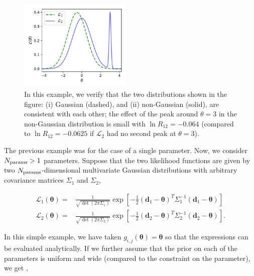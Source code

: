 \documentclass[amsmath, amssymb, reprint, aps]{revtex4-1}
\newcommand{\donev}{\textbf{d}_1}
\newcommand{\dtwov}{\textbf{d}_2}
\newcommand{\tv}{\bm{\theta}}
\begin{document}
{    \begin{figure}
        \centering
        \includegraphics[width=0.48\textwidth]{nongaus2.pdf}
        \caption{In this example, we verify that the two distributions shown in the figure: (i) Gaussian (dashed), and (ii) non-Gaussian (solid), are consistent with each other; the effect of the peak around $\theta=3$ in the non-Gaussian distribution is small with $\ln R_{12}=-0.064$ (compared to $\ln R_{12}=-0.0625$ if $\mathcal{L}_2$ had no second peak at $\theta=3$).}
        \label{fig:example1}
    \end{figure}
        
    The previous example was for the case of a single parameter. Now, we consider $N_{\rm params}>1$ parameters. Suppose that the two likelihood functions are given by two $N_{\rm params}$-dimensional multivariate Gaussian distributions with arbitrary covariance matrices $\Sigma_1$ and $\Sigma_2$,
        
    \begin{align}
        \mathcal{L}_1(\tv) =& \frac{1}{\sqrt{\det(2\pi \Sigma_1)}} \exp\left[{-\frac{1}{2}}(\donev-\tv)^T \Sigma_1^{-1} (\donev-\tv)\right] \nonumber \\
        \mathcal{L}_2(\tv) =& \frac{1}{\sqrt{\det(2\pi \Sigma_2)}} \exp\left[{-\frac{1}{2}}(\dtwov-\tv)^T \Sigma_2^{-1} (\dtwov-\tv)\right].\nonumber
    \end{align}
        
    In this simple example, we have taken $g_{i,j}(\tv) = \tv$ so that the expressions can be evaluated analytically. If we further assume that the prior on each of the parameters is uniform and wide (compared to the constraint on the parameter), we get \cite{IMM2012-03274},
    
}
\end{document}
